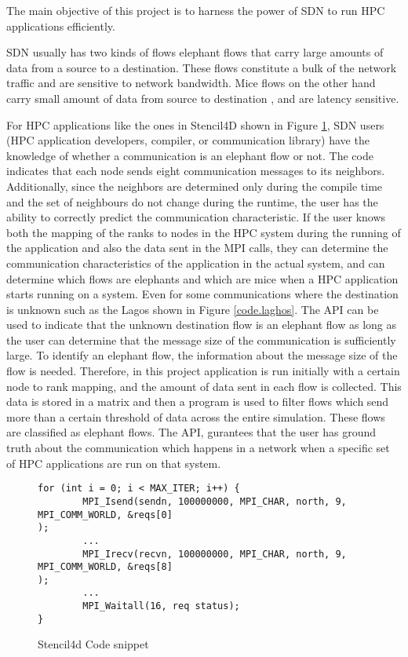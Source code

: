 The main objective of this project is to harness the power of SDN to run HPC applications efficiently.

SDN usually has two kinds of flows elephant flows that
carry large amounts of data from a source to a destination. These flows
constitute a bulk of the network traffic and are sensitive to network bandwidth.
Mice flows on the other hand carry small amount of data from source to
destination \cite{yang2020flow, afek2015sampling}, and are latency sensitive.

For HPC applications like the ones in Stencil4D shown in Figure \ref{code.stencil}, SDN
users (HPC application developers, compiler, or communication library) have the
knowledge of whether a communication is an elephant flow or not. The code indicates
that each node sends eight communication messages to its neighbors.
Additionally, since the neighbors are determined only during the compile time
and the set of neighbours do not change during the runtime, the user has the
ability to correctly predict the communication characteristic. If the user knows
both the mapping of the ranks to nodes in the HPC system during the running of the
application and also the data sent in the MPI calls, they can determine the
communication characteristics of the application in the actual system, and can
determine which flows are elephants and which are mice when a HPC application
starts running on a system. 
Even for some communications where the
destination is unknown such as the Lagos shown in
Figure \ref{code.laghos}. The API can be used to indicate that the unknown destination flow is
an elephant flow as long as the user can determine that the message size of the
communication is sufficiently large.
To identify an elephant flow, the information about the message size of the
flow is needed. Therefore, in this project application is run initially with a certain node to rank mapping, and the
amount of data sent in each flow is collected. This data is stored in a matrix and then a program is used to filter
flows which send more than a certain threshold of data across the entire simulation. 
These flows are classified as elephant flows. The API, gurantees that the user has ground truth about
the communication which happens in a network when a specific set of HPC applications are run on that 
system.

\begin{figure}[hbtp]
\caption{Stencil4d Code snippet}
\label{code.stencil}
\begin{lstlisting}[breaklines]
for (int i = 0; i < MAX_ITER; i++) {
        MPI_Isend(sendn, 100000000, MPI_CHAR, north, 9, MPI_COMM_WORLD, &reqs[0]
);
        ...
        MPI_Irecv(recvn, 100000000, MPI_CHAR, north, 9, MPI_COMM_WORLD, &reqs[8]
);
        ...
        MPI_Waitall(16, req status);
}
\end{lstlisting}
\end{figure}



